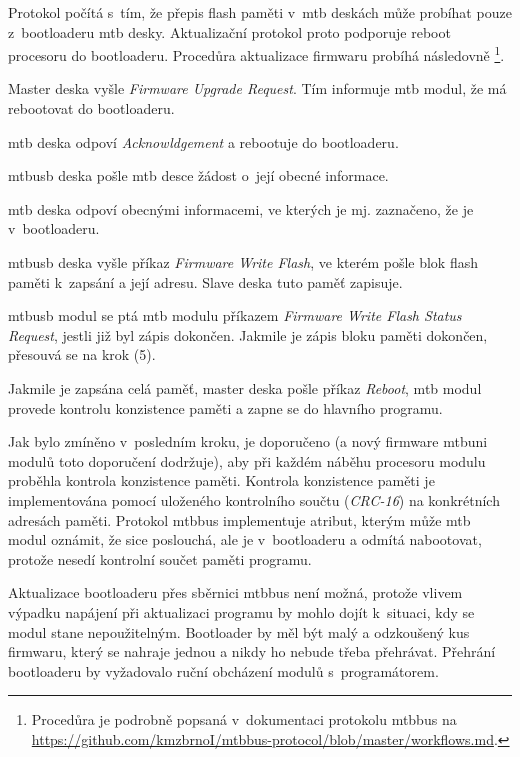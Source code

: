 Protokol počítá s~tím, že přepis flash paměti v~\gls{mtb} deskách může
probíhat pouze z~bootloaderu \gls{mtb} desky. Aktualizační protokol proto
podporuje reboot procesoru do bootloaderu. Procedůra aktualizace firmwaru
probíhá následovně \footnote{Procedůra je podrobně popsaná v~dokumentaci protokolu
\gls{mtbbus} na
\url{https://github.com/kmzbrnoI/mtbbus-protocol/blob/master/workflows.md}.}.

\begin{compactenum}
\item Master deska vyšle \textit{Firmware Upgrade Request}. Tím informuje \gls{mtb}
	modul, že má rebootovat do bootloaderu.
\item \gls{mtb} deska odpoví \textit{Acknowldgement} a rebootuje do bootloaderu.
\item \gls{mtbusb} deska pošle \gls{mtb} desce žádost o~její obecné informace.
\item \gls{mtb} deska odpoví obecnými informacemi, ve kterých je mj. zaznačeno,
	že je v~bootloaderu.
\item \gls{mtbusb} deska vyšle příkaz \textit{Firmware Write Flash}, ve kterém pošle
	blok flash paměti k~zapsání a její adresu. Slave deska tuto paměť zapisuje.
\item \gls{mtbusb} modul se ptá \gls{mtb} modulu příkazem \textit{Firmware Write
	Flash Status Request}, jestli již byl zápis dokončen. Jakmile je zápis bloku
	paměti dokončen, přesouvá se na krok (5).
\item Jakmile je zapsána celá paměť, master deska pošle příkaz \textit{Reboot},
	\gls{mtb} modul provede kontrolu konzistence paměti a zapne se do hlavního
	programu.
\end{compactenum}

Jak bylo zmíněno v~posledním kroku, je doporučeno (a nový firmware
\gls{mtbuni} modulů toto doporučení dodržuje), aby při každém náběhu
procesoru modulu proběhla kontrola konzistence paměti. Kontrola konzistence
paměti je implementována pomocí uloženého kontrolního součtu (\textit{CRC-16})
na konkrétních adresách paměti. Protokol \gls{mtbbus} implementuje atribut,
kterým může \gls{mtb} modul oznámit, že sice poslouchá, ale je v~bootloaderu
a odmítá nabootovat, protože nesedí kontrolní součet paměti programu.

Aktualizace bootloaderu přes sběrnici \gls{mtbbus} není možná, protože vlivem
výpadku napájení při aktualizaci programu by mohlo dojít k~situaci, kdy se modul
stane nepoužitelným. Bootloader by měl být malý a odzkoušený kus firmwaru, který
se nahraje jednou a nikdy ho nebude třeba přehrávat. Přehrání bootloaderu by
vyžadovalo ruční obcházení modulů s~programátorem.

